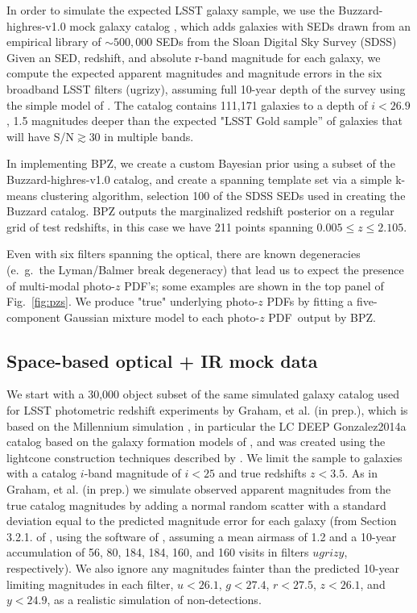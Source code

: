 \documentclass[\docopts]{\docclass}
\newcommand{\pz}{photo-$z$ PDF}
\begin{document}
In order to simulate the expected LSST galaxy sample, we use the 
Buzzard-highres-v1.0 mock galaxy catalog
, which adds galaxies with SEDs drawn from an empirical library of 
$\sim500,000$ SEDs from the Sloan Digital Sky Survey  (SDSS)
Given an SED, redshift, and absolute r-band magnitude for each galaxy, we 
compute the expected apparent magnitudes and magnitude errors in the six 
broadband LSST filters (ugrizy), assuming full 10-year depth of the survey 
using the simple model of \citet{ivezic_lsst:_2008}.  The catalog contains 
111,171 galaxies to a depth of $i<26.9$, 1.5 magnitudes deeper than the 
expected "LSST Gold sample'' of galaxies that will have S/N$\gtrsim$30 in 
multiple bands.

In implementing BPZ, we create a custom Bayesian prior using a subset of the 
Buzzard-highres-v1.0 catalog, and create a spanning template set via a simple 
k-means clustering algorithm, selection 100 of the SDSS SEDs used in creating 
the Buzzard catalog.  BPZ outputs the marginalized redshift posterior on a 
regular grid of test redshifts, in this case we have 211 points spanning 
$0.005\leq z\leq2.105$.

Even with six filters spanning the optical, there are known degeneracies 
(e.~g.~the Lyman/Balmer break degeneracy) that lead us to expect the presence 
of multi-modal \pz's; some examples are shown in the top panel of 
Fig.~\ref{fig:pzs}.  We produce "true" underlying \pz s by fitting a 
five-component Gaussian mixture model to each \pz\ output by BPZ.


\subsection{Space-based optical + IR mock data}
\label{sec:Euclid}


We start with a 30,000 object subset of the same simulated galaxy catalog used 
for LSST photometric redshift experiments by Graham, et al. (in prep.), which 
is based on the Millennium simulation \citep{springel_simulations_2005}, in 
particular the LC DEEP Gonzalez2014a
catalog based on the galaxy formation models of \cite{gonzalez-perez_how_2014}, 
and was created using the lightcone construction techniques described by 
\cite{merson_lightcone_2013}.  We limit the sample to galaxies with a catalog 
$i$-band magnitude of $i<25$ and true redshifts $z<3.5$. As in Graham, et al. 
(in prep.) we simulate observed apparent magnitudes from the true catalog 
magnitudes by adding a normal random scatter with a standard deviation equal to 
the predicted magnitude error for each galaxy (from Section 3.2.1. of 
\citealt{ivezic_lsst:_2008}, using the software of 
\citealt{connolly_end--end_2014}, assuming a mean airmass of 1.2 and a 10-year 
accumulation of 56, 80, 184, 184, 160, and 160 visits in filters $ugrizy$, 
respectively).  We also ignore any magnitudes fainter than the predicted 
10-year limiting magnitudes in each filter, $u<26.1$, $g<27.4$, $r<27.5$, 
$z<26.1$, and $y<24.9$, as a realistic simulation of non-detections.
\end{document}
